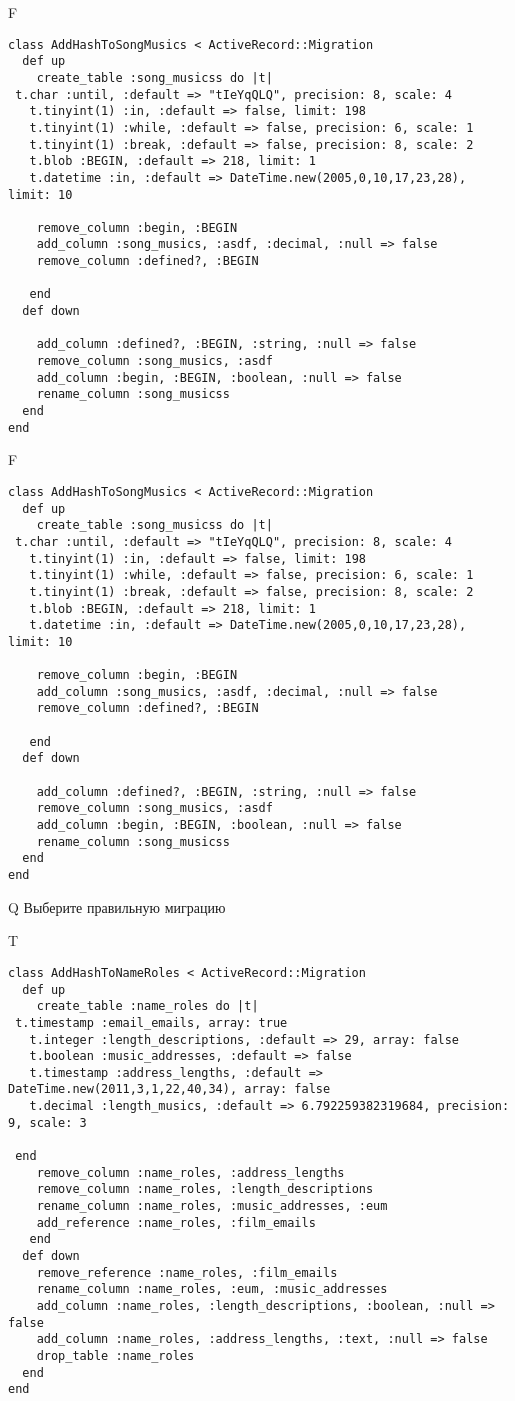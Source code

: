F
\begin{verbatim}
class AddHashToSongMusics < ActiveRecord::Migration
  def up
    create_table :song_musicss do |t| 
 t.char :until, :default => "tIeYqQLQ", precision: 8, scale: 4
   t.tinyint(1) :in, :default => false, limit: 198
   t.tinyint(1) :while, :default => false, precision: 6, scale: 1
   t.tinyint(1) :break, :default => false, precision: 8, scale: 2
   t.blob :BEGIN, :default => 218, limit: 1
   t.datetime :in, :default => DateTime.new(2005,0,10,17,23,28), limit: 10

    remove_column :begin, :BEGIN
    add_column :song_musics, :asdf, :decimal, :null => false
    remove_column :defined?, :BEGIN

   end
  def down

    add_column :defined?, :BEGIN, :string, :null => false
    remove_column :song_musics, :asdf
    add_column :begin, :BEGIN, :boolean, :null => false
    rename_column :song_musicss
  end
end
\end{verbatim}

F
\begin{verbatim}
class AddHashToSongMusics < ActiveRecord::Migration
  def up
    create_table :song_musicss do |t| 
 t.char :until, :default => "tIeYqQLQ", precision: 8, scale: 4
   t.tinyint(1) :in, :default => false, limit: 198
   t.tinyint(1) :while, :default => false, precision: 6, scale: 1
   t.tinyint(1) :break, :default => false, precision: 8, scale: 2
   t.blob :BEGIN, :default => 218, limit: 1
   t.datetime :in, :default => DateTime.new(2005,0,10,17,23,28), limit: 10

    remove_column :begin, :BEGIN
    add_column :song_musics, :asdf, :decimal, :null => false
    remove_column :defined?, :BEGIN

   end
  def down

    add_column :defined?, :BEGIN, :string, :null => false
    remove_column :song_musics, :asdf
    add_column :begin, :BEGIN, :boolean, :null => false
    rename_column :song_musicss
  end
end
\end{verbatim}
Q
Выберите правильную миграцию

T
\begin{verbatim}
class AddHashToNameRoles < ActiveRecord::Migration
  def up
    create_table :name_roles do |t|
 t.timestamp :email_emails, array: true
   t.integer :length_descriptions, :default => 29, array: false
   t.boolean :music_addresses, :default => false
   t.timestamp :address_lengths, :default => DateTime.new(2011,3,1,22,40,34), array: false
   t.decimal :length_musics, :default => 6.792259382319684, precision: 9, scale: 3

 end
    remove_column :name_roles, :address_lengths
    remove_column :name_roles, :length_descriptions
    rename_column :name_roles, :music_addresses, :eum
    add_reference :name_roles, :film_emails
   end
  def down
    remove_reference :name_roles, :film_emails
    rename_column :name_roles, :eum, :music_addresses
    add_column :name_roles, :length_descriptions, :boolean, :null => false
    add_column :name_roles, :address_lengths, :text, :null => false
    drop_table :name_roles
  end
end
\end{verbatim}

